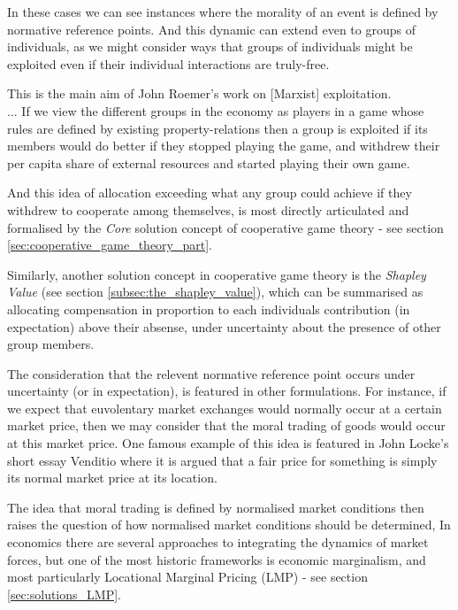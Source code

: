 In these cases we can see instances where the morality of an event is defined by normative reference points. And this dynamic can extend even to groups of individuals, as we might consider ways that groups of individuals might be exploited even if their individual interactions are truly-free.
\begin{displayquote}
This is the main aim of John Roemer's work on [Marxist] exploitation.\\... %
If we view the different groups in the economy as players in a game whose rules are defined by existing property-relations then a group is exploited if its members would do better if they stopped playing the game, and withdrew their per capita share of external resources and started playing their own game.\cite{kymlicka2002contemporary}
\end{displayquote}
And this idea of allocation exceeding what any group could achieve if they withdrew to cooperate among themselves, is most directly articulated and formalised by the \textit{Core} solution concept of cooperative game theory - see section \ref{sec:cooperative_game_theory_part}.

Similarly, another solution concept in cooperative game theory is the \textit{Shapley Value} (see section \ref{subsec:the_shapley_value}), which can be summarised as allocating compensation in proportion to each individuals contribution (in expectation) above their absense, under uncertainty about the presence of other group members.

The consideration that the relevent normative reference point occurs under uncertainty (or in expectation), is featured in other formulations.
For instance, if we expect that euvolentary market exchanges would normally occur at a certain market price, then we may consider that the moral trading of goods would occur at this market price.
One famous example of this idea is featured in John Locke's short essay Venditio \cite{locke2003locke} where it is argued that a fair price for something is simply its normal market price at its location.

The idea that moral trading is defined by normalised market conditions then raises the question of how normalised market conditions should be determined,
In economics there are several approaches to integrating the dynamics of market forces, but one of the most historic frameworks is economic marginalism, and most particularly Locational Marginal Pricing (LMP) - see section \ref{sec:solutions_LMP}.\\

